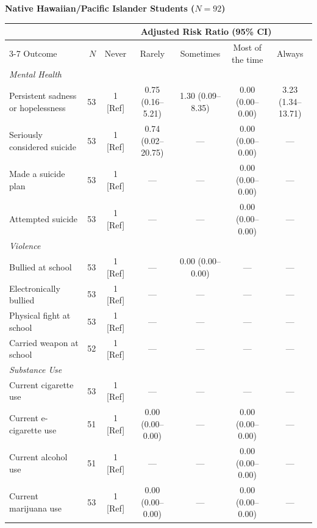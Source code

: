 \documentclass[12pt]{article}
\begin{document}
\begin{landscape}
\nobreak\noindent\textbf{Native Hawaiian/Pacific Islander Students ($N = 92$)}
\nopagebreak\par\nopagebreak\vspace{1pt}\nopagebreak
\nobreak\noindent\begin{tabular}{l r ccccc}
\toprule
 & & \multicolumn{5}{c}{Adjusted Risk Ratio (95\% CI)} \\
\cmidrule(lr){3-7}
Outcome & $N$ & Never & Rarely & Sometimes & Most of the time & Always \\
\midrule
\textit{Mental Health} \\
\quad Persistent sadness or hopelessness & 53 & 1 [Ref] & 0.75 (0.16--5.21) & 1.30 (0.09--8.35) & 0.00 (0.00--0.00) & 3.23 (1.34--13.71) \\
\quad Seriously considered suicide & 53 & 1 [Ref] & 0.74 (0.02--20.75) & --- & 0.00 (0.00--0.00) & --- \\
\quad Made a suicide plan & 53 & 1 [Ref] & --- & --- & 0.00 (0.00--0.00) & --- \\
\quad Attempted suicide & 53 & 1 [Ref] & --- & --- & 0.00 (0.00--0.00) & --- \\
\addlinespace[4pt]
\textit{Violence} \\
\quad Bullied at school & 53 & 1 [Ref] & --- & 0.00 (0.00--0.00) & --- & --- \\
\quad Electronically bullied & 53 & 1 [Ref] & --- & --- & --- & --- \\
\quad Physical fight at school & 53 & 1 [Ref] & --- & --- & --- & --- \\
\quad Carried weapon at school & 52 & 1 [Ref] & --- & --- & --- & --- \\
\addlinespace[4pt]
\textit{Substance Use} \\
\quad Current cigarette use & 53 & 1 [Ref] & --- & --- & --- & --- \\
\quad Current e-cigarette use & 51 & 1 [Ref] & 0.00 (0.00--0.00) & --- & 0.00 (0.00--0.00) & --- \\
\quad Current alcohol use & 51 & 1 [Ref] & --- & --- & 0.00 (0.00--0.00) & --- \\
\quad Current marijuana use & 53 & 1 [Ref] & 0.00 (0.00--0.00) & --- & 0.00 (0.00--0.00) & --- \\
\bottomrule
\end{tabular}\par\vspace{8pt}


\end{landscape}
\end{document}
